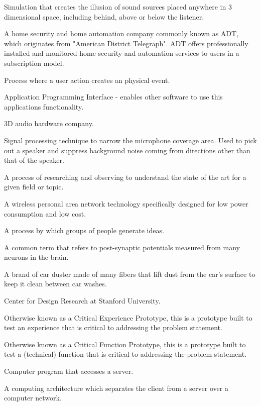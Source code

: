 \item [3D audio technology] Simulation that creates the illusion of sound sources placed anywhere in 3 dimensional space, including behind, above or below the listener.
\item [ADT] A home security and home automation company commonly known as ADT, which originates from "American District Telegraph". ADT offers professionally installed and monitored home security and automation services to users in a subscription model.
\item[Action-event control] Process where a user action creates an physical event.
\item [API] Application Programming Interface - enables other software to use this applications functionality.
\item [Ausim] 3D audio hardware company.
\item [Automatic beam steering] Signal processing technique to narrow the microphone coverage area. Used to pick out a speaker and suppress background noise coming from directions other than that of the speaker.
\item[Benchmarking] A process of researching and observing to understand the state of the art for a given field or topic.
\item[Bluetooth Smart] A wireless personal area network technology specifically designed for low power consumption and low cost.
\item[Brainstorming] A process by which groups of people generate ideas.
\item [Brainwaves] A common term that refers to post-synaptic potentials measured from many neurons in the brain.
\item [California Duster] A brand of car duster made of many fibers that lift dust from the car’s surface to keep it clean between car washes.
\item [CDR] Center for Design Research at Stanford University.
\item [CEP] Otherwise known as a Critical Experience Prototype, this is a prototype built to test an experience that is critical to addressing the problem statement.
\item [CFP] Otherwise known as a Critical Function Prototype, this is a prototype built to test a (technical) function that is critical to addressing the problem statement.
\item [Client] Computer program that accesses a server.
\item [Client-server paradigm] A computing architecture which separates the client from a server over a computer network. 
